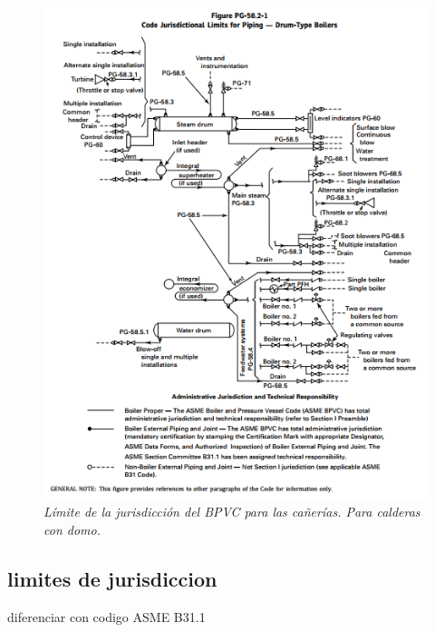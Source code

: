 \begin{figure}[ht]
    \centerline{\includegraphics[scale=0.6]{PG-58.2-1.png}}
    \caption{\textit{Límite de la jurisdicción del BPVC para las cañerías. Para calderas con domo.}}
    \label{im:PG-58.2-1}
\end{figure}




\subsection{limites de jurisdiccion}
diferenciar con codigo ASME B31.1